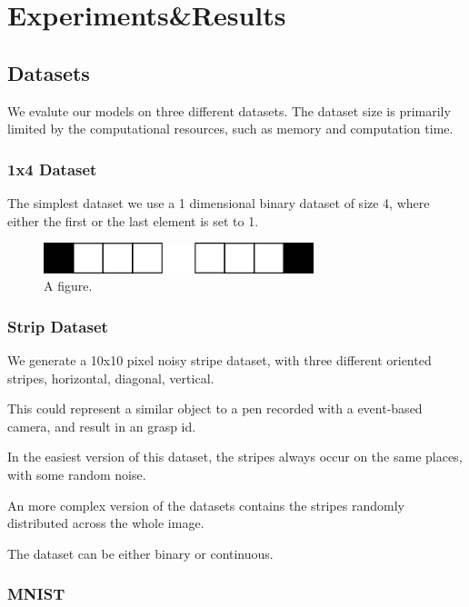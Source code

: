 \chapter{Experiments\&Results}

\section{Datasets}

We evalute our models on three different datasets.
The dataset size is primarily limited by the computational resources, such as memory and computation time. 

\subsection{1x4 Dataset}

The simplest dataset we use a 1 dimensional binary dataset of size 4, where either the first or the last element is set to 1. 

\begin{figure}
	\centering
    	\includegraphics[width=0.7\textwidth]{imgs/1x4_ds.png} 
    \caption{A figure.}
	\label{fig:test}
\end{figure}

\subsection{Strip Dataset}

We generate a 10x10 pixel noisy stripe dataset, with three different oriented stripes, horizontal, diagonal, vertical. 

This could represent a similar object to a pen recorded with a event-based camera, and result in an grasp id.

In the easiest version of this dataset, the stripes always occur on the same places, with some random noise.

An more complex version of the datasets contains the stripes randomly distributed across the whole image.

The dataset can be either binary or continuous.

\subsection{MNIST}

